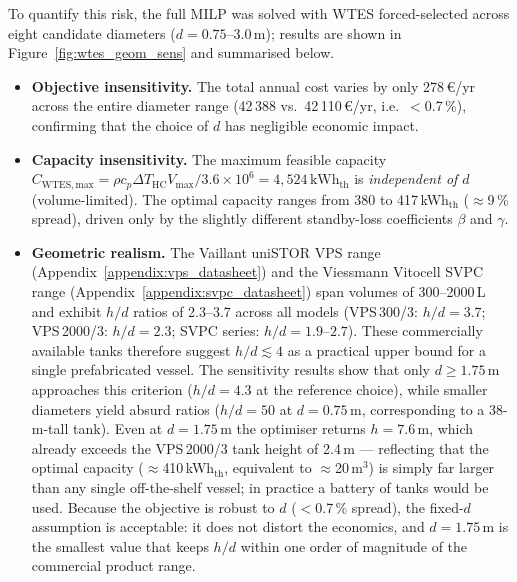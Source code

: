 \documentclass[11pt,a4paper]{report}
\begin{document}
To quantify this risk, the full MILP was solved with WTES forced-selected across
eight candidate diameters ($d = 0.75\text{--}3.0\,\text{m}$); results are shown in
Figure~\ref{fig:wtes_geom_sens} and summarised below.

\begin{itemize}
    \item \textbf{Objective insensitivity.}
          The total annual cost varies by only 278\,\euro/yr across the entire
          diameter range (42\,388 vs.\ 42\,110\,\euro/yr, i.e.\ $<$0.7\,\%), confirming
          that the choice of $d$ has negligible economic impact.

    \item \textbf{Capacity insensitivity.}
          The maximum feasible capacity $C_\mathrm{WTES,max} = \rho c_p \Delta T_\mathrm{HC}
          V_\mathrm{max}/3.6{\times}10^6 = 4{,}524\,\text{kWh}_\mathrm{th}$ is
          \emph{independent of $d$} (volume-limited).
          The optimal capacity ranges from 380 to 417\,kWh$_\mathrm{th}$
          ($\approx$9\,\% spread), driven only by the slightly different standby-loss
          coefficients $\beta$ and $\gamma$.

    \item \textbf{Geometric realism.}
          The Vaillant uniSTOR VPS range (Appendix~\ref{appendix:vps_datasheet})
          and the Viessmann Vitocell SVPC range (Appendix~\ref{appendix:svpc_datasheet})
          span volumes of 300--2000\,L and exhibit $h/d$ ratios of 2.3--3.7 across
          all models (VPS\,300/3: $h/d = 3.7$; VPS\,2000/3: $h/d = 2.3$;
          SVPC series: $h/d = 1.9$--$2.7$).
          These commercially available tanks therefore suggest $h/d \lesssim 4$ as a
          practical upper bound for a single prefabricated vessel.
          The sensitivity results show that only $d \geq 1.75\,\text{m}$ approaches
          this criterion ($h/d = 4.3$ at the reference choice), while smaller
          diameters yield absurd ratios ($h/d = 50$ at $d = 0.75\,\text{m}$,
          corresponding to a 38-m-tall tank).
          Even at $d = 1.75\,\text{m}$ the optimiser returns $h = 7.6\,\text{m}$,
          which already exceeds the VPS\,2000/3 tank height of 2.4\,m --- reflecting
          that the optimal capacity ($\approx$410\,kWh$_\mathrm{th}$, equivalent to
          $\approx$20\,m$^3$) is simply far larger than any single off-the-shelf
          vessel; in practice a battery of tanks would be used.
          Because the objective is robust to $d$ ($<$0.7\,\% spread), the
          fixed-$d$ assumption is acceptable: it does not distort the economics, and
          $d = 1.75\,\text{m}$ is the smallest value that keeps $h/d$ within one
          order of magnitude of the commercial product range.
\end{itemize}
\end{document}
